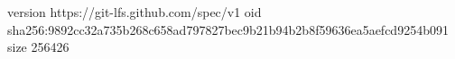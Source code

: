 version https://git-lfs.github.com/spec/v1
oid sha256:9892cc32a735b268c658ad797827bec9b21b94b2b8f59636ea5aefcd9254b091
size 256426
